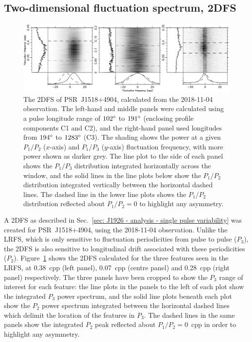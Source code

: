 \subsection{Two-dimensional fluctuation spectrum, 2DFS}
\label{sec: J1518 - analysis - 2DFS}
\begin{figure}
    \begin{center}
        \includegraphics[width=\textwidth]{Figures/J1518/2DFS_all}
        \caption[2DFS of PSR~J1518+4904]{The 2DFS of PSR~J1518+4904, calculated from the 2018-11-04 observation. The left-hand and middle panels were calculated using a pulse longitude range of $102^\circ$ to $191^\circ$ (enclosing profile components C1 and C2), and the right-hand panel used longitudes from $194^\circ$ to $1283^\circ$ (C3). The shading shows the power at a given $P_1/P_2$ ($x$-axis) and $P_1/P_3$ ($y$-axis) fluctuation frequency, with more power shown as darker grey. The line plot to the side of each panel shows the $P_1/P_3$ distribution integrated horizontally across the window, and the solid lines in the line plots below show the $P_1/P_2$ distribution integrated vertically between the horizontal dashed lines. The dashed line in the lower line plots shows the $P_1/P_2$ distribution reflected about $P_1/P_2 = 0$ to highlight any asymmetry.}
        \label{fig: J1518 - 2DFS}
    \end{center}
\end{figure}

A 2DFS as described in Sec.~\ref{sec: J1926 - analysis - single pulse variability} was created for PSR~J1518+4904, using the 2018-11-04 observation. Unlike the LRFS, which is only sensitive to fluctuation periodicities from pulse to pulse ($P_3$), the 2DFS is also sensitive to longitudinal drift associated with these periodicities ($P_2$). Figure~\ref{fig: J1518 - 2DFS} shows the 2DFS calculated for the three features seen in the LRFS, at 0.38~cpp (left panel), 0.07~cpp (centre panel) and 0.28~cpp (right panel) respectively. The three panels have been cropped to show the $P_3$ range of interest for each feature: the line plots in the panels to the left of each plot show the integrated $P_3$ power spectrum, and the solid line plots beneath each plot show the $P_2$ power spectrum integrated between the horizontal dashed lines which delimit the location of the features in $P_3$. The dashed lines in the same panels show the integrated $P_2$ peak reflected about $P_1/P_2 = 0$~cpp in order to highlight any asymmetry.

